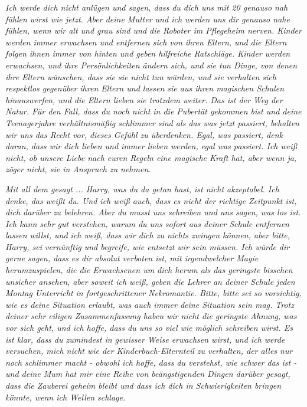 \emph{Ich werde dich nicht anlügen und sagen, dass du dich uns mit 20 genauso
nah fühlen wirst wie jetzt. Aber deine Mutter und ich werden uns dir genauso
nahe fühlen, wenn wir alt und grau sind und die Roboter im Pflegeheim nerven.
Kinder werden immer erwachsen und entfernen sich von ihren Eltern, und die
Eltern folgen ihnen immer von hinten und geben hilfreiche Ratschläge. Kinder
werden erwachsen, und ihre Persönlichkeiten ändern sich, und sie tun Dinge, von
denen ihre Eltern wünschen, dass sie sie nicht tun würden, und sie verhalten
sich respektlos gegenüber ihren Eltern und lassen sie aus ihren magischen
Schulen hinauswerfen, und die Eltern lieben sie trotzdem weiter. Das ist der Weg
der Natur. Für den Fall, dass du noch nicht in die Pubertät gekommen bist und
deine Teenagerjahre verhältnismäßig schlimmer sind als das was jetzt passiert,
behalten wir uns das Recht vor, dieses Gefühl zu überdenken. Egal, was passiert,
denk daran, dass wir dich lieben und immer lieben werden, egal was passiert. Ich
weiß nicht, ob unsere Liebe nach euren Regeln eine magische Kraft hat, aber wenn
ja, zöger nicht, sie in Anspruch zu nehmen.}

\emph{Mit all dem gesagt ... Harry, was du da getan hast, ist nicht akzeptabel.
Ich denke, das weißt du. Und ich weiß auch, dass es nicht der richtige Zeitpunkt
ist, dich darüber zu belehren. Aber du musst uns schreiben und uns sagen, was
los ist. Ich kann sehr gut verstehen, warum du uns sofort aus deiner Schule
entfernen lassen willst, und ich weiß, dass wir dich zu nichts zwingen können,
aber bitte, Harry, sei vernünftig und begreife, wie entsetzt wir sein müssen.
Ich würde dir gerne sagen, dass es dir absolut verboten ist, mit irgendwelcher
Magie herumzuspielen, die die Erwachsenen um dich herum als das geringste
bisschen unsicher ansehen, aber soweit ich weiß, geben die Lehrer an deiner
Schule jeden Montag Unterricht in fortgeschrittener Nekromantie. Bitte, bitte
sei so vorsichtig, wie es deine Situation erlaubt, was auch immer deine
Situation sein mag. Trotz deiner sehr eiligen Zusammenfassung haben wir nicht
die geringste Ahnung, was vor sich geht, und ich hoffe, dass du uns so viel wie
möglich schreiben wirst. Es ist klar, dass du zumindest in gewisser Weise
erwachsen wirst, und ich werde versuchen, mich nicht wie der
Kinderbuch-Elternteil zu verhalten, der alles nur noch schlimmer macht - obwohl
ich hoffe, dass du verstehst, wie schwer das ist - und deine Mum hat mir eine
Reihe von beängstigenden Dingen darüber gesagt, dass die Zauberei geheim bleibt
und dass ich dich in Schwierigkeiten bringen könnte, wenn ich Wellen schlage.}

